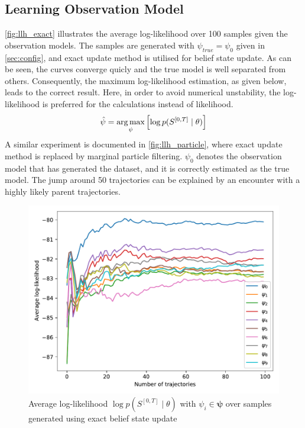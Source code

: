 \subsection{Learning Observation Model}
\autoref{fig:llh_exact} illustrates the average log-likelihood over 100 samples given the observation models. The samples are generated with $ \psi_{true} = \psi_0 $ given in \cref{sec:config}, and exact update method is utilised for belief state update. As can be seen, the curves converge quicly and the true model is well separated from others. Consequently, the maximum log-likelihood estimation, as given below, leads to the correct result. Here, in order to avoid numerical unstability, the log-likelihood is preferred for the calculations instead of likelihood.
\begin{equation}
\hat{\psi} = \operatorname*{arg\,max}_\psi \left[ \log p(S^{[0,T]} \mid \theta )\right] 
\label{eq:max_llh_est}
\end{equation}
A similar experiment is documented in \autoref{fig:llh_particle}, where exact update method is replaced by marginal particle filtering. $ \psi_0 $ denotes the observation model that has generated the dataset, and it is correctly estimated as the true model. The jump around 50 trajectories can be explained by an encounter with a highly likely parent trajectories.
\begin{figure}[H]
	\begin{center}
		\includegraphics[width=.7\textwidth]{figures/roc_analysis/roc_exactUpdate/llh_exactUpdate_psi_0}
		\caption[Average log-likelihood in the case of exact belief update]{Average log-likelihood $ \log p(S^{[0,T]} \mid \theta) $ with $ \psi_i \in \symbf{\psi} $ over samples generated using exact belief state update}
		\label{fig:llh_exact}
	\end{center}
\end{figure}
